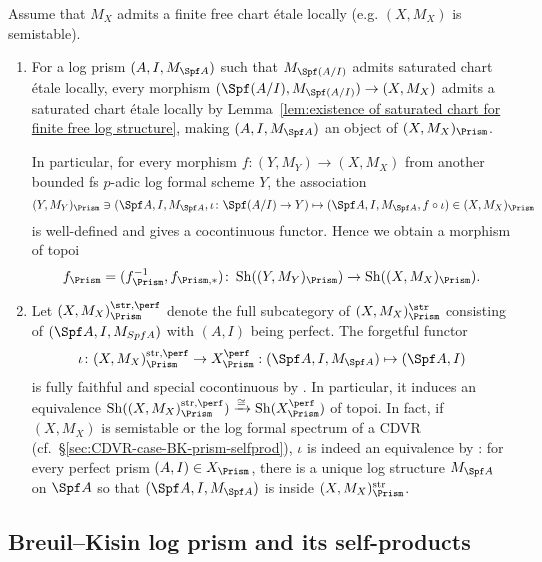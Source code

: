 \begin{rem}\label{rem:log prismatic site when admitting finite free chart}
    Assume that $M_X$ admits a finite free chart \'etale locally (e.g. $(X,M_X)$ is semistable). 
\begin{enumerate}
    \item 
For a log prism $(A,I,M_{\Spf A})$ such that $M_{\Spf (A/I)}$ admits saturated chart \'etale locally, every morphism $(\Spf (A/I),M_{\Spf (A/I)}) \rightarrow (X, M_X)$ admits a saturated chart \'etale locally by Lemma~\ref{lem:existence of saturated chart for finite free log structure}, making $(A,I,M_{\Spf A})$ an object of $(X,M_X)_\Prism$.

In particular, for every morphism $f\colon (Y,M_Y)\rightarrow (X,M_X)$ from another bounded fs $p$-adic log formal scheme $Y$, the association 
\[
    (Y,M_Y)_\Prism\ni
    (\Spf A, I, M_{\Spf A}, \iota\colon \Spf (A/I)\rightarrow Y)
    \mapsto (\Spf A, I, M_{\Spf A}, f\circ \iota)\in (X,M_X)_\Prism
    \]
    is well-defined and gives a cocontinuous functor. Hence we obtain a morphism of topoi
    \[
    f_\Prism=(f^{-1}_\Prism, f_{\Prism,\ast})\colon \operatorname{Sh}((Y,M_Y)_\Prism)\rightarrow\operatorname{Sh}((X,M_X)_\Prism).
 \]
\item 
Let $(X,M_X)_\Prism^{\str,\perf}$ denote the full subcategory of $(X,M_X)_\Prism^{\str}$ consisting of $(\Spf A,I,M_{Spf A})$ with $(A,I)$ being perfect.
The forgetful functor 
\[
\iota\colon (X,M_X)_\Prism^{\mathrm{str},\perf}\rightarrow X_\Prism^\perf: (\Spf A, I, M_{\Spf A})\mapsto (\Spf A, I)
\]
is fully faithful and special cocontinuous by \cite[Rem.~2.20]{min-wang-HT-crys-log-prism}. In particular, it induces an equivalence $\operatorname{Sh}((X,M_X)_\Prism^{\mathrm{str},\perf})\xrightarrow{\cong}\operatorname{Sh}(X_\Prism^\perf)$ of topoi.
In fact, if $(X,M_X)$ is semistable or the log formal spectrum of a CDVR (cf.~\S\ref{sec:CDVR-case-BK-prism-selfprod}), $\iota$ is indeed an equivalence by \cite[Prop.~2.18]{min-wang-HT-crys-log-prism}: for every perfect prism $(A,I)\in X_\Prism$, there is a unique log structure $M_{\Spf A}$ on $\Spf A$ so that $(\Spf A,I,M_{\Spf A})$ is inside $(X,M_X)_\Prism^{\mathrm{str}}$.
\end{enumerate}    
\end{rem}

\subsection{Breuil--Kisin log prism and its self-products} \label{sec:Breuil--Kisin log prism}

